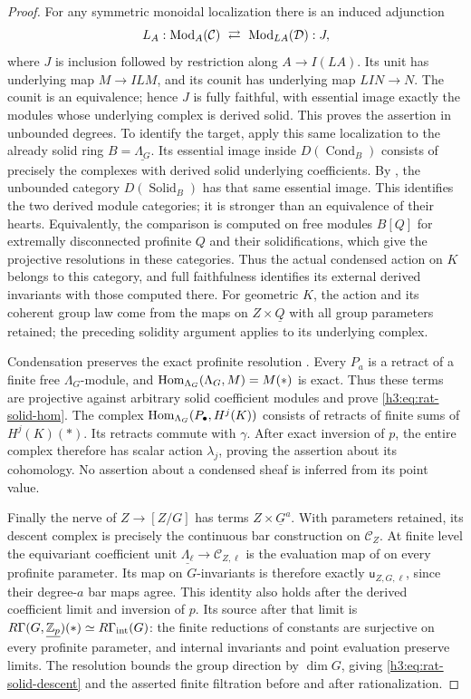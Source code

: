 \begin{proof}
For any symmetric monoidal localization there is an induced
adjunction
\[
 L_A:\operatorname{Mod}_A(\mathcal C)\ \rightleftarrows\
       \operatorname{Mod}_{LA}(\mathcal D):J,
\]
where $J$ is inclusion followed by restriction along
$A\to I(LA)$.  Its unit has underlying map $M\to ILM$,
and its counit has underlying map $LIN\to N$.
The counit is an equivalence; hence $J$ is fully faithful,
with essential image exactly the modules whose underlying
complex is derived solid.  This proves the assertion in
unbounded degrees.  To identify the target, apply this same
localization to the already solid ring
$B=\underline{\Lambda_G}$.  Its essential image inside
$D(\operatorname{Cond}_B)$ consists of precisely the
complexes with derived solid underlying coefficients.
By \cite[Theorem~4.4]{Tang}, the unbounded category
$D(\operatorname{Solid}_B)$ has that same essential image.
This identifies the two derived module categories; it is
stronger than an equivalence of their hearts.  Equivalently,
the comparison is computed on free modules $B[Q]$ for
extremally disconnected profinite $Q$ and their solidifications,
which give the projective resolutions in these categories.
Thus the actual condensed action on $K$ belongs to this
category, and full faithfulness identifies its external
derived invariants with those computed there.  For geometric
$K$, the action and its coherent group law come from the
maps on $Z\times\underline Q$ with all group parameters
retained; the preceding solidity argument applies to its
underlying complex.

Condensation preserves the exact profinite resolution
\cite[Theorem~3.2]{Tang}.  Every $P_a$ is a retract of a finite
free $\Lambda_G$-module, and
$\operatorname{Hom}_{\Lambda_G}(\Lambda_G,M)=M(*)$ is exact.  Thus these terms
are projective against arbitrary solid coefficient modules and
prove \eqref{h3:eq:rat-solid-hom}.  The complex
$\operatorname{Hom}_{\Lambda_G}(P_\bullet,H^j(K))$ consists of retracts of
finite sums of $H^j(K)(*)$.  Its retracts commute with $\gamma$.
After exact inversion of $p$, the entire complex therefore has
scalar action $\lambda_j$, proving the assertion about its
cohomology.  No assertion about a condensed sheaf is inferred from
its point value.

Finally the nerve of $Z\to[Z/G]$ has terms
$Z\times\underline G^a$.  With parameters retained, its
descent complex is precisely the continuous bar construction on
$\mathscr C_Z$.  At finite level the equivariant coefficient unit
$\underline{\Lambda_\ell}\to\mathscr C_{Z,\ell}$ is the evaluation
map of \Cref{h3:rat:finite-classifying} on every profinite parameter.
Its map on $G$-invariants is therefore exactly
$\mathsf u_{Z,G,\ell}$, since their degree-$a$ bar maps agree.
This identity also holds after the derived coefficient limit and
inversion of $p$.  Its source after that limit is
$R\Gamma(G,\underline{\mathbb Z_p})(*)\simeq R\Gamma_{\mathrm{int}}(G)$:
the finite reductions of constants are surjective on every profinite
parameter, and internal invariants and point evaluation preserve
limits.  The resolution bounds the group direction by
$\dim G$, giving \eqref{h3:eq:rat-solid-descent} and the asserted
finite filtration before and after rationalization.
\end{proof}

